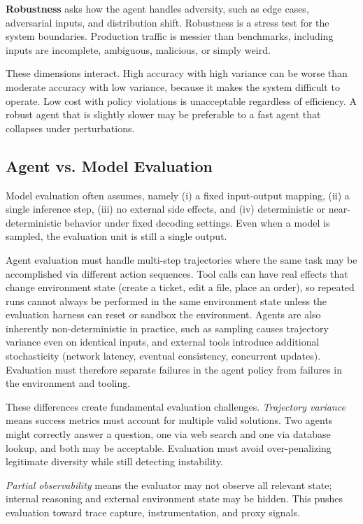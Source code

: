 \textbf{Robustness} asks how the agent handles adversity, such as edge cases, adversarial inputs, and distribution shift. Robustness is a stress test for the system boundaries. Production traffic is messier than benchmarks, including inputs are incomplete, ambiguous, malicious, or simply weird.

These dimensions interact. High accuracy with high variance can be worse than moderate accuracy with low variance, because it makes the system difficult to operate. Low cost with policy violations is unacceptable regardless of efficiency. A robust agent that is slightly slower may be preferable to a fast agent that collapses under perturbations.

\subsection{Agent vs. Model Evaluation}

Model evaluation often assumes, namely (i) a fixed input-output mapping, (ii) a single inference step, (iii) no external side effects, and (iv) deterministic or near-deterministic behavior under fixed decoding settings. Even when a model is sampled, the evaluation unit is still a single output.

Agent evaluation must handle multi-step trajectories where the same task may be accomplished via different action sequences. Tool calls can have real effects that change environment state (create a ticket, edit a file, place an order), so repeated runs cannot always be performed in the same environment state unless the evaluation harness can reset or sandbox the environment. Agents are also inherently non-deterministic in practice, such as sampling causes trajectory variance even on identical inputs, and external tools introduce additional stochasticity (network latency, eventual consistency, concurrent updates). Evaluation must therefore separate failures in the agent policy from failures in the environment and tooling.

These differences create fundamental evaluation challenges. \textit{Trajectory variance} means success metrics must account for multiple valid solutions. Two agents might correctly answer a question, one via web search and one via database lookup, and both may be acceptable. Evaluation must avoid over-penalizing legitimate diversity while still detecting instability.

\textit{Partial observability} means the evaluator may not observe all relevant state; internal reasoning and external environment state may be hidden. This pushes evaluation toward trace capture, instrumentation, and proxy signals.

